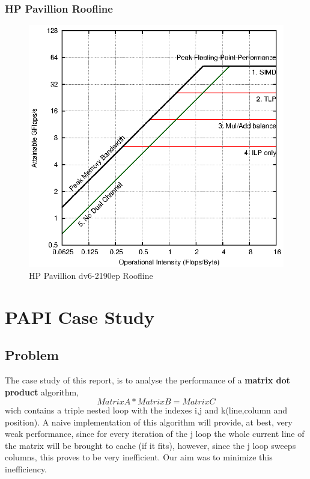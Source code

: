 \documentclass[a4paper,10pt,openright,openbib,twocolumn]{article}
\begin{document}
\subsubsection{HP Pavillion Roofline}
\begin{figure}[!htp]
	\centering
	\begin{minipage}[t]{\columnwidth}
		\includegraphics[width=\textwidth]{images/roofline_hp.eps}
		\caption{HP Pavillion dv6-2190ep Roofline \label{fig:roofline2}}
	\end{minipage}
\end{figure}

\section{PAPI Case Study}
\subsection{Problem}
The case study of this report, is to analyse the performance of a \textbf{matrix dot product} algorithm, \begin{equation}Matrix A * Matrix B = Matrix C\end{equation} wich contains a triple nested loop with the indexes i,j and k(line,column and position). A naive implementation of this algorithm will provide, at best, very weak performance, since for every iteration of the j loop the whole current line of the matrix will be brought to cache (if it fits), however, since the j loop sweeps columns, this proves to be very inefficient. Our aim was to minimize this inefficiency.
\end{document}
